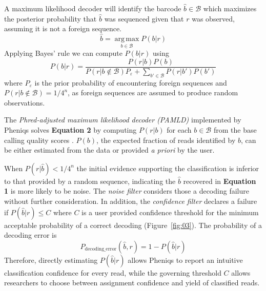 \documentclass[10pt,twocolumn]{article}
\begin{document}
A maximum likelihood decoder will identify the barcode $\hat{b} \in \mathcal{B}$ which maximizes the posterior probability that $\hat{b}$ was sequenced given that $r$ was observed, assuming it is not a foreign sequence.
%
\begin{equation}
\hat{b} = \operatorname*{arg\,max}_{b \in \mathcal{B}} P(b|r)
\end{equation}
%
Applying Bayes' rule we can compute $P(b|r)$ using
%
\begin{equation}
P(b|r) = \frac{P(r|b)P(b)}{P(r|b \notin \mathcal{B})P_{\varepsilon} + \sum_{b' \in \mathcal{B}} P(r|b')P(b')}
\end{equation}
%
where $P_\varepsilon$ is the prior probability of encountering foreign sequences and $P(r|b \notin \mathcal{B}) = 1/4^n$, as foreign sequences are assumed to produce random observations.

The \emph{Phred-adjusted maximum likelihood decoder (PAMLD)} implemented by Pheniqs solves \textbf{Equation 2} by computing $P(r|b)$ for each $b \in \mathcal{B}$ from the base calling quality scores \citep{doi:10.1093/bioinformatics/btv401}. $P(b)$, the expected fraction of reads identified by $b$, can be either estimated from the data or provided \emph{a priori} by the user.

When $P(r|\hat{b}) < 1/4^n$ the initial evidence supporting the classification is inferior to that provided by a random sequence, indicating the $\hat{b}$ recovered in \textbf{Equation 1} is more likely to be noise. The \emph{noise filter} considers those a decoding failure without further consideration.
%
In addition, the \emph{confidence filter} declares a failure if $P(\hat{b}|r) \leq C$ where $C$ is a user provided confidence threshold for the minimum acceptable probability of a correct decoding (Figure~\ref{fig:03}). The probability of a decoding error is
%
\begin{equation}
P_{\text{decoding\_error}}(\hat{b}, r) = 1 - P(\hat{b}|r)
\end{equation}
%
Therefore, directly estimating $P(\hat{b}|r)$ allows Pheniqs to report an intuitive classification confidence for every read, while the governing threshold $C$ allows researchers to choose between assignment confidence and yield of classified reads.
\end{document}

